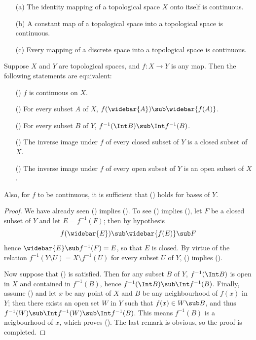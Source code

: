 \begin{example}
\mbox{}
\begin{enumerate}
\item[(a)] The identity mapping of a topological space $X$ onto itself is continuous.
\item[(b)] A constant map of a topological space into a topological space is continuous.
\item[(c)] Every mapping of a discrete space into a topological space is continuous.
\end{enumerate}
\end{example}
\begin{theorem}\label{topo space continuous map iff}
Suppose $X$ and $Y$ are topological spaces, and $f:X\to Y$ is any
map. Then the following statements are equivalent:
\begin{itemize}
\item[(\rmnum{1})] $f$ is continuous on $X$.
\item[(\rmnum{2})] For every subset $A$ of $X$, $f(\widebar{A})\sub\widebar{f(A)}$.
\item[(\rmnum{3})] For every subset $B$ of $Y$, $f^{-1}(\Int B)\sub\Int f^{-1}(B)$.
\item[(\rmnum{4})] The inverse image under $f$ of every closed subset of $Y$ is a closed subset of $X$.
\item[(\rmnum{5})] The inverse image under $f$ of every open subset of $Y$ is an open subset of $X$. 
\end{itemize}
Also, for $f$ to be continuous, it is sufficient that () holds for bases of $Y$.
\end{theorem}
\begin{proof}
We have already seen () implies (). To see () implies (), let $F$ be a closed subset of $Y$ and let $E=f^{-1}(F)$; then by hypothesis
\[f(\widebar{E})\sub\widebar{f(E)}\sub F\]
hence $\widebar{E}\sub f^{-1}(F)=E$, so that $E$ is closed. By virtue of the relation $f^{-1}(Y\setminus U)=X\setminus f^{-1}(U)$ for every subset $U$ of $Y$, () implies ().\par
Now suppose that () is satisfied. Then for any subset $B$ of $Y$, $f^{-1}(\Int B)$ is open in $X$ and contained in $f^{-1}(B)$, hence $f^{-1}(\Int B)\sub\Int f^{-1}(B)$. Finally, assume () and let $x$ be any point of $X$ and $B$ be any neighbourhood of $f(x)$ in $Y$; then there exists an open set $W$ in $Y$ such that $f(x)\in W\sub B$, and thus $f^{-1}(W)\sub\Int f^{-1}(W)\sub\Int f^{-1}(B)$. This means $f^{-1}(B)$ is a neigbourhood of $x$, which proves (). The last remark is obvious, so the proof is completed.
\end{proof}

